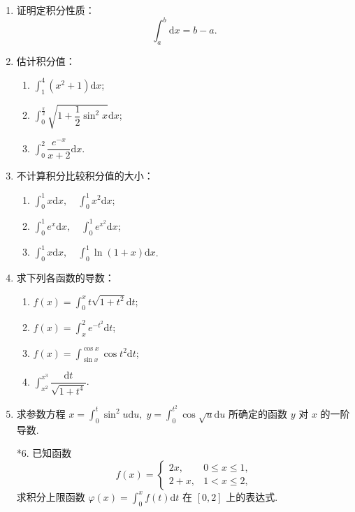 \begin{enumerate}\setlength{\itemsep}{7pt}
    \item 证明定积分性质：
    \[
        \int_a^b\text{d}x=b-a.
    \]

    \item 估计积分值：
    \begin{enumerate}[(1)]\setlength{\itemsep}{5pt}\setlength{\topsep}{15pt}
        \item $\displaystyle\int_1^4(x^2+1)\text{d}x$;
        \item $\displaystyle\int_0^{\frac{\pi}{2}}\sqrt{1+\dfrac{1}{2}\sin^2x}\text{d}x$;
        \item $\displaystyle\int_0^{2}\dfrac{e^{-x}}{x+2}\text{d}x$.
    \end{enumerate}

    \item 不计算积分比较积分值的大小：
    \begin{enumerate}[(1)]\setlength{\itemsep}{5pt}\setlength{\topsep}{15pt}
        \item $\displaystyle\int_0^1x\text{d}x,\quad\int_0^1x^2\text{d}x$;
        \item $\displaystyle\int_0^1e^x\text{d}x,\quad\int_0^1e^{x^2}\text{d}x$;
        \item $\displaystyle\int_0^1x\text{d}x,\quad\int_0^1\ln(1+x)\text{d}x$.
    \end{enumerate}

    \item 求下列各函数的导数：
    \begin{enumerate}[(1)]\setlength{\itemsep}{5pt}\setlength{\topsep}{15pt}
        \item $\displaystyle f(x)=\int_0^xt\sqrt{1+t^2}\text{d}t$;
        \item $\displaystyle f(x)=\int_x^2e^{-t^2}\text{d}t$;
        \item $\displaystyle f(x)=\int_{\sin x}^{\cos x}\cos t^2\text{d}t$;
        \item $\displaystyle \int_{x^2}^{x^3}\dfrac{\text{d}t}{\sqrt{1+t^4}}$.
    \end{enumerate}

    \item 求参数方程 
    $\displaystyle x=\int_0^t\sin^2u\text{d}u,\;y=\int_0^{t^2}\cos\sqrt{u}\text{d}u$ 
    所确定的函数 $y$ 对 $x$ 的一阶导数.

    \item[*6.] 已知函数
    \[
        f(x)=\begin{cases}
            2x,&0\leqslant x\leqslant 1,\\
            2+x,&1<x\leqslant 2,
        \end{cases}
    \] 
    求积分上限函数 $\displaystyle\varphi(x)=\int_0^xf(t)\text{d}t$ 在 $[0,2]$ 上的表达式.


\end{enumerate}
